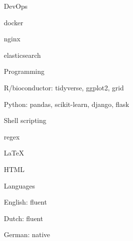 

\begin{cvskills}

  \cvskill
    {DevOps}%
    {
      \begin{cvitems}
        \item docker
        \item nginx
        \item elasticsearch
      \end{cvitems}
    }

  \cvskill
    {Programming} %
    {
      \begin{cvitems}
        \item R/bioconductor: tidyverse, ggplot2, grid
        \item Python: pandas, scikit-learn, django, flask 
        \item Shell scripting
        \item regex
        \item LaTeX
        \item HTML%
      \end{cvitems}
    }


  \cvskill
    {Languages} %
    {
      \begin{cvitems}
        \item English: fluent
        \item Dutch: fluent
        \item German: native
      \end{cvitems}
    }

\end{cvskills}
